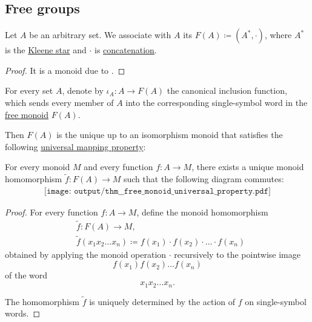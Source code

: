 \subsection{Free groups}\label{subsec:free_groups}

\begin{definition}\label{def:free_monoid}
  Let \( A \) be an arbitrary set. We associate with \( A \) its  \( F(A) \coloneqq (A^*, \cdot) \), where \( A^* \) is the \hyperref[def:formal_language/kleene_star]{Kleene star} and \( \cdot \) is \hyperref[def:formal_language/concatenation]{concatenation}.
\end{definition}
\begin{proof}
  It is a monoid due to .
\end{proof}

\begin{proposition}\label{thm:free_monoid_universal_property}
  For every set \( A \), denote by \( \iota_A: A \to F(A) \) the canonical inclusion function, which sends every member of \( A \) into the corresponding single-symbol word in the \hyperref[def:free_monoid]{free monoid} \( F(A) \).

  Then \( F(A) \) is the unique up to an isomorphism monoid that satisfies the following \hyperref[rem:universal_mapping_property]{universal mapping property}:
  \begin{displayquote}
    For every monoid \( M \) and every function \( f: A \to M \), there exists a unique monoid homomorphism \( \widetilde{f}: F(A) \to M \) such that the following diagram commutes:
    \begin{equation}\label{eq:thm:free_monoid_universal_property/diagram}
      \begin{aligned}
        \texttt{[image: output/thm\_\_free\_monoid\_universal\_property.pdf]}
      \end{aligned}
    \end{equation}
  \end{displayquote}
\end{proposition}
\begin{proof}
  For every function \( f: A \to M \), define the monoid homomorphism
  \begin{equation*}
    \begin{aligned}
      &\widetilde{f}: F(A) \to M, \\
      &\widetilde{f}(x_1 x_2 \ldots x_n) \coloneqq f(x_1) \cdot f(x_2) \cdot \ldots \cdot f(x_n)
    \end{aligned}
  \end{equation*}
  obtained by applying the monoid operation \( \cdot \) recursively to the pointwise image
  \begin{equation*}
    f(x_1) f(x_2) \ldots f(x_n)
  \end{equation*}
  of the word
  \begin{equation*}
    x_1 x_2 \ldots x_n.
  \end{equation*}

  The homomorphism \( \widetilde{f} \) is uniquely determined by the action of \( f \) on single-symbol words.
\end{proof}

